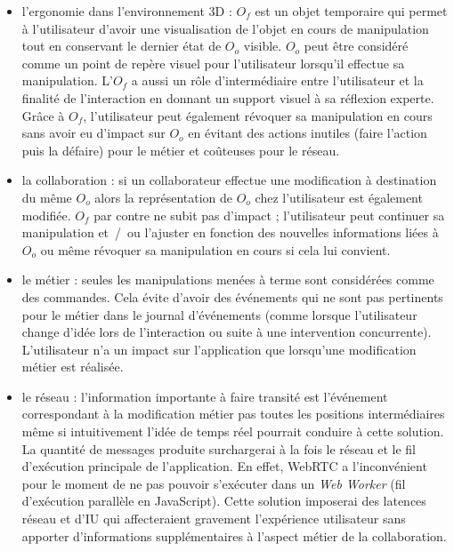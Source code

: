 \begin{itemize}
	\item l'ergonomie dans l'environnement \gls{3D} :
	$O_f$ est un objet temporaire qui permet à l'utilisateur
	d'avoir une visualisation de l'objet en cours de manipulation tout en 
	conservant le dernier état de $O_o$ visible. 
	$O_o$ peut être considéré comme un point de repère visuel pour l'utilisateur 
	lorsqu'il effectue sa manipulation. 
	L'$O_f$ a aussi un rôle d'intermédiaire entre l'utilisateur et la 
	finalité de l'interaction en donnant un support visuel à sa réflexion experte.
	Grâce à $O_f$, l'utilisateur peut également révoquer sa manipulation en 
	cours sans avoir eu d'impact sur $O_o$ en évitant des actions inutiles (faire 
	l'action 
	puis la défaire) pour le métier et coûteuses pour le réseau.
	
	\item la collaboration : si un collaborateur effectue une modification 
	à destination du même $O_o$ alors la représentation de $O_o$ chez 
	l'utilisateur est également modifiée. $O_f$ par contre ne subit pas d'impact ; 
	l'utilisateur peut continuer sa manipulation et~/~ou l'ajuster en fonction des 
	nouvelles informations liées à $O_o$ ou même révoquer sa manipulation 
	en cours si cela lui convient.
	
	\item le métier : seules les manipulations menées à terme sont 
	considérées comme des commandes. Cela évite d'avoir des événements qui ne 
	sont pas pertinents pour le métier dans le journal d'événements (comme lorsque 
	l'utilisateur change d'idée lors de l'interaction ou
	suite à une intervention concurrente). L'utilisateur n'a un impact sur l'application 
	que lorsqu'une modification métier est réalisée.
	
	\item le réseau : l'information importante à faire transité est l'événement 
	correspondant à la modification métier pas toutes les positions intermédiaires 
	même si intuitivement l'idée de temps réel pourrait conduire à cette solution. La 
	quantité de messages produite surchargerai à la fois le réseau et le fil 
	d'exécution principale de l'application. En effet, \gls{WebRTC} a l'inconvénient 
	pour le 
	moment de ne pas pouvoir s'exécuter dans un \textit{Web Worker} (fil 
	d'exécution 
	parallèle en JavaScript). Cette solution imposerai des 
	latences réseau et d'\gls{IU} qui affecteraient gravement l'expérience utilisateur
	sans apporter d'informations supplémentaires à l'aspect métier de la 
	collaboration. 
\end{itemize}



